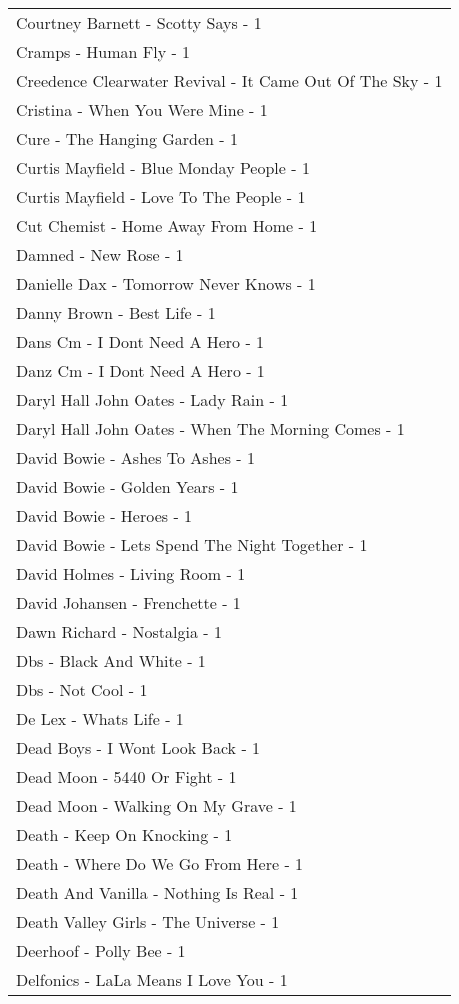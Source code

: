 \documentclass[
]{article}
\begin{document}
\begin{longtable}{l}
Courtney Barnett - Scotty Says - 1 \\ 
Cramps - Human Fly - 1 \\ 
Creedence Clearwater Revival - It Came Out Of The Sky - 1 \\ 
Cristina - When You Were Mine - 1 \\ 
Cure - The Hanging Garden - 1 \\ 
Curtis Mayfield - Blue Monday People - 1 \\ 
Curtis Mayfield - Love To The People - 1 \\ 
Cut Chemist - Home Away From Home - 1 \\ 
Damned - New Rose - 1 \\ 
Danielle Dax - Tomorrow Never Knows - 1 \\ 
Danny Brown - Best Life - 1 \\ 
Dans Cm - I Dont Need A Hero - 1 \\ 
Danz Cm - I Dont Need A Hero - 1 \\ 
Daryl Hall John Oates - Lady Rain - 1 \\ 
Daryl Hall John Oates - When The Morning Comes - 1 \\ 
David Bowie - Ashes To Ashes - 1 \\ 
David Bowie - Golden Years - 1 \\ 
David Bowie - Heroes - 1 \\ 
David Bowie - Lets Spend The Night Together - 1 \\ 
David Holmes - Living Room - 1 \\ 
David Johansen - Frenchette - 1 \\ 
Dawn Richard - Nostalgia - 1 \\ 
Dbs - Black And White - 1 \\ 
Dbs - Not Cool - 1 \\ 
De Lex - Whats Life - 1 \\ 
Dead Boys - I Wont Look Back - 1 \\ 
Dead Moon - 5440 Or Fight - 1 \\ 
Dead Moon - Walking On My Grave - 1 \\ 
Death - Keep On Knocking - 1 \\ 
Death - Where Do We Go From Here - 1 \\ 
Death And Vanilla - Nothing Is Real - 1 \\ 
Death Valley Girls - The Universe - 1 \\ 
Deerhoof - Polly Bee - 1 \\ 
Delfonics - LaLa Means I Love You - 1 \\ 

\end{longtable}
\end{document}
